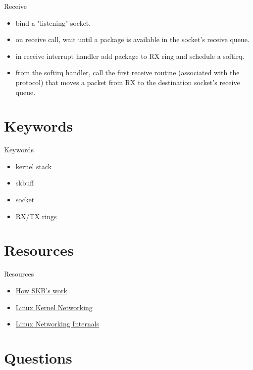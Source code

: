 \documentclass{workshop}
\begin{document}
\begin{frame}{Receive}
\begin{itemize}
\item bind a "listening" socket.
\item on receive call, wait until a package is available in the socket's
receive queue.
\item in receive interrupt handler add package to RX ring and schedule a softirq.
\item from the softirq handler, call the first receive routine (associated
    with the protocol) that moves a packet from RX to the destination socket's receive queue.
\end{itemize}
\end{frame}

\section{Keywords}
\begin{frame}{Keywords}
\begin{itemize}
\item kernel stack
\item skbuff
\item socket
\item RX/TX rings
\end{itemize}
\end{frame}

\section{Resources}
\begin{frame}{Resources}
\begin{itemize}
  \item \href{http://vger.kernel.org/~davem/skb.html}{How SKB's work}
  \item \href{http://www.haifux.org/lectures/217/netLec5.pdf}{Linux Kernel Networking}
  \item \href{http://www.scribd.com/doc/3471003/Linux-Networking-Internals}{Linux Networking Internals}
\end{itemize}
\end{frame}

\section{Questions}
\end{document}
